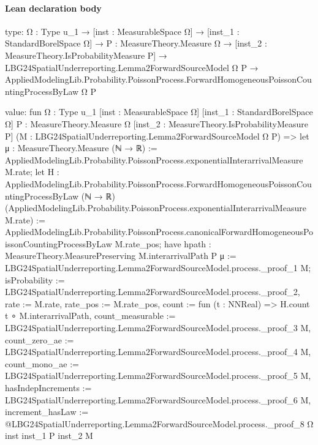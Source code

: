 \documentclass[10pt]{article}
\begin{document}
\paragraph{Lean declaration body}
\begin{ReviewVerbatim}
type:
{Ω : Type u_1} →
  [inst : MeasurableSpace Ω] →
    [inst_1 : StandardBorelSpace Ω] →
      {P : MeasureTheory.Measure Ω} →
        [inst_2 : MeasureTheory.IsProbabilityMeasure P] →
          LBG24SpatialUnderreporting.Lemma2ForwardSourceModel Ω P →
            AppliedModelingLib.Probability.PoissonProcess.ForwardHomogeneousPoissonCountingProcessByLaw Ω P

value:
fun {Ω : Type u_1} [inst : MeasurableSpace Ω] [inst_1 : StandardBorelSpace Ω] {P : MeasureTheory.Measure Ω}
    [inst_2 : MeasureTheory.IsProbabilityMeasure P] (M : LBG24SpatialUnderreporting.Lemma2ForwardSourceModel Ω P) =>
  let μ : MeasureTheory.Measure (ℕ → ℝ) :=
    AppliedModelingLib.Probability.PoissonProcess.exponentialInterarrivalMeasure M.rate;
  let H :
    AppliedModelingLib.Probability.PoissonProcess.ForwardHomogeneousPoissonCountingProcessByLaw (ℕ → ℝ)
      (AppliedModelingLib.Probability.PoissonProcess.exponentialInterarrivalMeasure M.rate) :=
    AppliedModelingLib.Probability.PoissonProcess.canonicalForwardHomogeneousPoissonCountingProcessByLaw M.rate_pos;
  have hpath : MeasureTheory.MeasurePreserving M.interarrivalPath P μ :=
    LBG24SpatialUnderreporting.Lemma2ForwardSourceModel.process._proof_1 M;
  { isProbability := LBG24SpatialUnderreporting.Lemma2ForwardSourceModel.process._proof_2, rate := M.rate,
    rate_pos := M.rate_pos, count := fun (t : NNReal) => H.count t ∘ M.interarrivalPath,
    count_measurable := LBG24SpatialUnderreporting.Lemma2ForwardSourceModel.process._proof_3 M,
    count_zero_ae := LBG24SpatialUnderreporting.Lemma2ForwardSourceModel.process._proof_4 M,
    count_mono_ae := LBG24SpatialUnderreporting.Lemma2ForwardSourceModel.process._proof_5 M,
    hasIndepIncrements := LBG24SpatialUnderreporting.Lemma2ForwardSourceModel.process._proof_6 M,
    increment_hasLaw := @LBG24SpatialUnderreporting.Lemma2ForwardSourceModel.process._proof_8 Ω inst inst_1 P inst_2 M }
\end{ReviewVerbatim}
\end{document}
